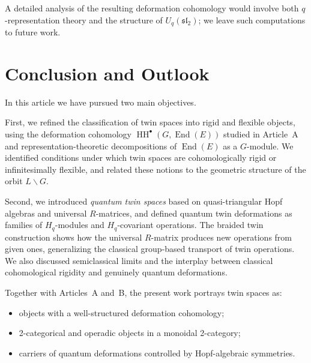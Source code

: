 \documentclass[11pt,a4paper]{article}
\numberwithin{equation}{section}
\DeclareMathOperator{\End}{End}
\DeclareMathOperator{\HH}{HH}
\newcommand{\LinearSubgroup}{L}
\begin{document}
	A detailed analysis of the resulting deformation cohomology would involve both $q$-representation theory
	and the structure of $U_q(\mathfrak{sl}_2)$; we leave such computations to future work.
	
	\section{Conclusion and Outlook}
	\label{sec:conclusion}
	
	In this article we have pursued two main objectives.
	
	First, we refined the classification of twin spaces into rigid and flexible objects, using the deformation 
	cohomology $\HH^\bullet(G,\End(E))$ studied in Article~A and representation-theoretic decompositions of 
	$\End(E)$ as a $G$-module. We identified conditions under which twin spaces are cohomologically rigid or 
	infinitesimally flexible, and related these notions to the geometric structure of the orbit $\LinearSubgroup\backslash G$.
	
	Second, we introduced \emph{quantum twin spaces} based on quasi-triangular Hopf algebras and universal 
	$R$-matrices, and defined quantum twin deformations as families of $H_q$-modules and $H_q$-covariant operations.
	The braided twin construction shows how the universal $R$-matrix produces new operations from given ones, 
	generalizing the classical group-based transport of twin operations. We also discussed semiclassical limits 
	and the interplay between classical cohomological rigidity and genuinely quantum deformations.
	
	Together with Articles~A and~B, the present work portrays twin spaces as:
	\begin{itemize}
		\item objects with a well-structured deformation cohomology;
		\item 2-categorical and operadic objects in a monoidal 2-category;
		\item carriers of quantum deformations controlled by Hopf-algebraic symmetries.
	\end{itemize}
	
\end{document}
